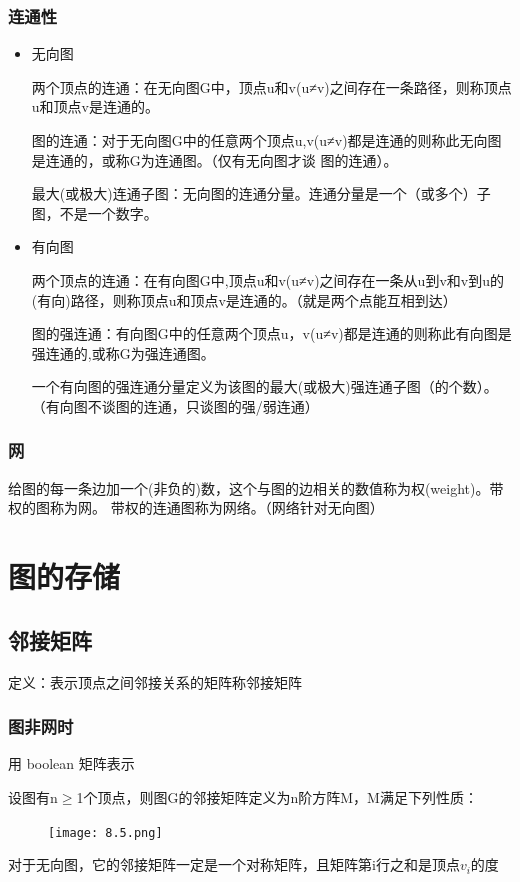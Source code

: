 \documentclass[AutoFakeBold]{LZUThesis2007}
\begin{document}
			\subsubsection{连通性}
\begin{itemize}
	\item 无向图

两个顶点的连通：在无向图G中，顶点u和v(u≠v)之间存在一条路径，则称顶点u和顶点v是连通的。

图的连通：对于无向图G中的任意两个顶点u,v(u≠v)都是连通的则称此无向图是连通的，或称G为连通图。（仅有无向图才谈 图的连通）。

最大(或极大)连通子图：无向图的连通分量。连通分量是一个（或多个）子图，不是一个数字。
	\item 有向图

两个顶点的连通：在有向图G中,顶点u和v(u≠v)之间存在一条从u到v和v到u的(有向)路径，则称顶点u和顶点v是连通的。（就是两个点能互相到达）

图的强连通：有向图G中的任意两个顶点u，v(u≠v)都是连通的则称此有向图是强连通的,或称G为强连通图。

一个有向图的强连通分量定义为该图的最大(或极大)强连通子图（的个数）。（有向图不谈图的连通，只谈图的强/弱连通）
\end{itemize}

			\subsubsection{网}
给图的每一条边加一个(非负的)数，这个与图的边相关的数值称为权(weight)。带权的图称为网。
带权的连通图称为网络。（网络针对无向图）

	\section{图的存储}			
		\subsection{邻接矩阵}
定义：表示顶点之间邻接关系的矩阵称邻接矩阵
			\subsubsection{图非网时}
用 boolean 矩阵表示

设图有n$\ge$1个顶点，则图G的邻接矩阵定义为n阶方阵M，M满足下列性质：
\begin{figure}[H]
    \centering
    \texttt{[image: 8.5.png]}

\end{figure}
对于无向图，它的邻接矩阵一定是一个对称矩阵，且矩阵第i行之和是顶点$v_{i}$的度
\end{document}
